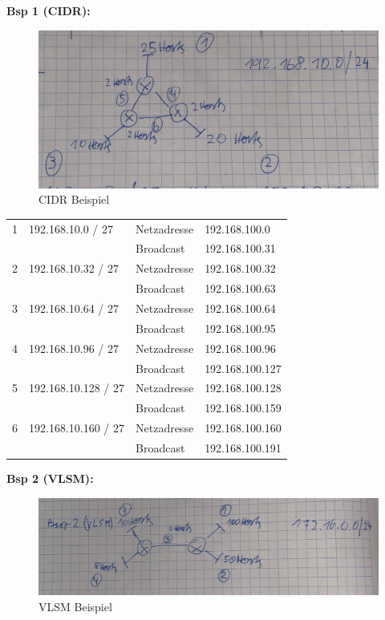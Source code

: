 \textbf{Bsp 1 (CIDR):}
\begin{figure}[H]
	\centering
	\includegraphics[width=1.0\linewidth]{figures/bsp1_cidr.jpeg}
	\caption{CIDR Beispiel}
	\label{fig:bsp1_cidr}
\end{figure}

\begin{table}[H]
	\begin{tabular}{llll}
		1 & 192.168.10.0 / 27 & Netzadresse & 192.168.100.0 \\
		&  & Broadcast & 192.168.100.31 \\
		\hline
		2 & 192.168.10.32 / 27 & Netzadresse & 192.168.100.32 \\
		&  & Broadcast & 192.168.100.63 \\
		\hline
		3 & 192.168.10.64 / 27 & Netzadresse & 192.168.100.64 \\
		&  & Broadcast & 192.168.100.95 \\
		\hline
		4 & 192.168.10.96 / 27 & Netzadresse & 192.168.100.96 \\
		&  & Broadcast & 192.168.100.127 \\
		\hline
		5 & 192.168.10.128 / 27 & Netzadresse & 192.168.100.128 \\
		&  & Broadcast & 192.168.100.159 \\
		\hline
		6 & 192.168.10.160 / 27 & Netzadresse & 192.168.100.160 \\
		&  & Broadcast & 192.168.100.191
	\end{tabular}
\end{table}

\textbf{Bsp 2 (VLSM):}
\begin{figure}[H]
	\centering
	\includegraphics[width=1.0\linewidth]{figures/bsp2_vlsm.jpeg}
	\caption{VLSM Beispiel}
	\label{fig:bsp2_vlsm}
\end{figure}

